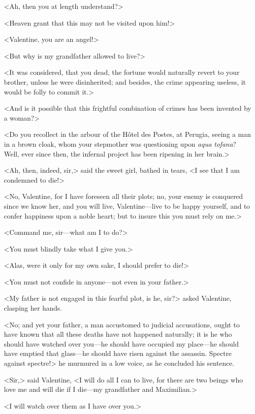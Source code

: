  <Ah, then you at length understand?> 

 <Heaven grant that this may not be visited upon him!> 

 <Valentine, you are an angel!> 

 <But why is my grandfather allowed to live?> 

 <It was considered, that you dead, the fortune would naturally revert to your brother, unless he were disinherited; and besides, the crime appearing useless, it would be folly to commit it.> 

 <And is it possible that this frightful combination of crimes has been invented by a woman?> 

 <Do you recollect in the arbour of the Hôtel des Postes, at Perugia, seeing a man in a brown cloak, whom your stepmother was questioning upon \textit{aqua tofana}? Well, ever since then, the infernal project has been ripening in her brain.> 

 <Ah, then, indeed, sir,> said the sweet girl, bathed in tears, <I see that I am condemned to die!> 

 <No, Valentine, for I have foreseen all their plots; no, your enemy is conquered since we know her, and you will live, Valentine—live to be happy yourself, and to confer happiness upon a noble heart; but to insure this you must rely on me.> 

 <Command me, sir—what am I to do?> 

 <You must blindly take what I give you.> 

 <Alas, were it only for my own sake, I should prefer to die!> 

 <You must not confide in anyone—not even in your father.> 

 <My father is not engaged in this fearful plot, is he, sir?> asked Valentine, clasping her hands. 

 <No; and yet your father, a man accustomed to judicial accusations, ought to have known that all these deaths have not happened naturally; it is he who should have watched over you—he should have occupied my place—he should have emptied that glass—he should have risen against the assassin. Spectre against spectre!> he murmured in a low voice, as he concluded his sentence. 

 <Sir,> said Valentine, <I will do all I can to live, for there are two beings who love me and will die if I die—my grandfather and Maximilian.> 

 <I will watch over them as I have over you.> 

